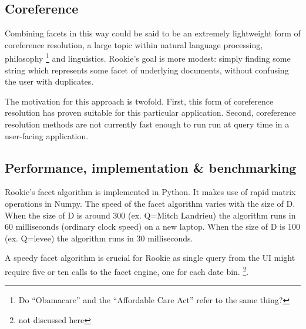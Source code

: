 \documentclass{article}
\begin{document}
\subsection{Coreference}

Combining facets in this way could be said to be an extremely lightweight form of coreference resolution, a large topic within natural language processing, philosophy \footnote{Do ``Obamacare'' and the ``Affordable Care Act'' refer to the same thing?} and linguistics. Rookie's goal is more modest: simply finding some string which represents some facet of underlying documents, without confusing the user with duplicates. 

The motivation for this approach is twofold. First, this form of coreference resolution has proven suitable for this particular application. Second, coreference resolution methods are not currently fast enough to run run at query time in a user-facing application.


\subsection{Performance, implementation \& benchmarking}

Rookie's facet algorithm is implemented in Python. It makes use of rapid matrix operations in Numpy. The speed of the facet algorithm varies with the size of D. When the size of D is around 300 (ex. Q=Mitch Landrieu) the algorithm runs in 60 milliseconds (ordinary clock speed) on a new laptop. When the size of D is 100 (ex. Q=levee) the algorithm runs in 30 milliseconds. 

A speedy facet algorithm is crucial for Rookie as single query from the UI might require five or ten calls to the facet engine, one for each date bin. \footnote{not discussed here}.
\end{document}
